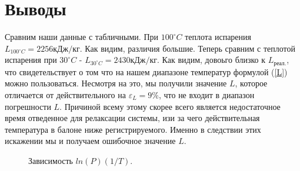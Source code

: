 \documentclass[a4paper, 12pt]{article}
\begin{document}
    \section{Выводы}
    Сравним наши данные с табличными. При $100 ^\circ C$ теплота испарения $L_{100^\circ C}=2256кДж/кг$. Как видим, различия большие. Теперь сравним с теплотой испарения при $30 ^\circ C$ - $L_{30 ^\circ C}=2430кДж/кг$. Как видим, довоьго близко к $L_{реал.}$, что свидетельствует о том что на нашем диапазоне температур формулой (\ref{L}) можно пользоваться. Несмотря на это, мы получили значение $L$, которое отличается от действительного на $\varepsilon_L = 9\%$, что не входит в диапазон погрешности $L$. Причиной всему этому скорее всего является недостаточное время отведенное для релаксации системы, изи за чего действительная температура в балоне ниже регистрируемого. Именно в следствии этих искажении мы и получаем ошибочное значение $L$.



    \begin{figure}
        \label{lnP}
        \caption{Зависимость $ln(P) (1/T)$.}
    \end{figure}
\end{document}
